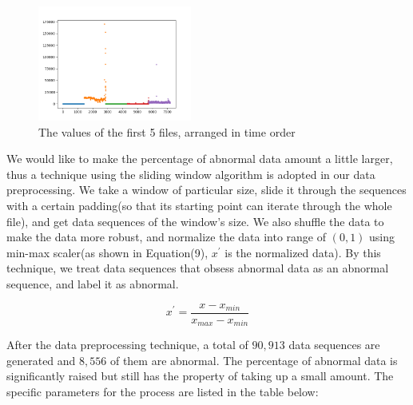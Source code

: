 \documentclass{acmtog} %
\begin{document}
\begin{figure}[h]
   \begin{center}
      \includegraphics[width=0.45\textwidth]{value_trend.png}
   \end{center}
\caption{The values of the first 5 files, arranged in time order}
\label{RTL}
\end{figure}

We would like to make the percentage of abnormal data amount a little larger, thus a technique using the sliding window algorithm is adopted in our data preprocessing. We take a window of particular size, slide it through the sequences with a certain padding(so that its starting point can iterate through the whole file), and get data sequences of the window's size. We also shuffle the data to make the data more robust, and normalize the data into range of $(0, 1)$ using min-max scaler(as shown in Equation(9), $x^{'}$ is the normalized data). By this technique, we treat data sequences that obsess abnormal data as an abnormal sequence, and label it as abnormal.

\begin{equation}
x^{'} = \frac{x - x_{min}}{x_{max} - x_{min}}
\label{eq:samplevar}
\end{equation}

After the data preprocessing technique, a total of $90,913$ data sequences are generated and $8,556$ of them are abnormal. The percentage of abnormal data is significantly raised but still has the property of taking up a small amount. The specific parameters for the process are listed in the table below:

\begin{table}[h]
\end{table}
\end{document}
